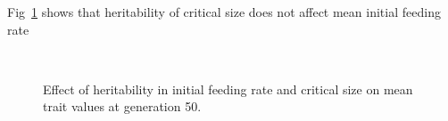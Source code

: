 Fig~\ref{fig:omg_fr_mc} shows that heritability of critical size does not affect mean initial feeding rate 
\begin{figure}[p]
  \\
  \caption{Effect of heritability in initial feeding rate and critical size on mean trait values at generation 50.}
  \label{fig:omg_fr_mc}
\end{figure}
